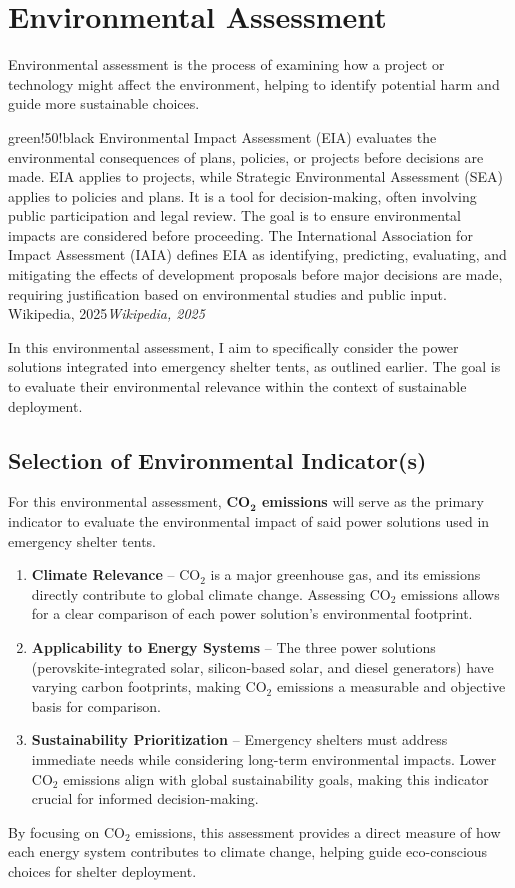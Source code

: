 \documentclass{article}
\newcommand{\formalsource}{}
\newenvironment{formal}[3][]{	\renewcommand{\formalsource}{#1}
	\def\lefty{\color{#2}\textquotedblleft}
	\def\righty{\color{#2}\textquotedblright}
	\def\FrameCommand{%
		\hspace{1pt}%
		{\color{#2}\vrule width 2pt}%
		{\color{#3}\vrule width 4pt}%
		\colorbox{#3}%
	}%
	\MakeFramed{\advance\hsize-\width\FrameRestore}%
    \begin{adjustwidth}{5pt}{7pt}%
	\vspace{4pt}%
	\ifx#2\empty\else\smash{\raisebox{-0.5em}{\huge\lefty}}\hspace{0em}\fi%
	}{%
	\hspace{0em}\smash{\raisebox{-0.5em}{\huge\righty}}\\%
	\vspace{0pt}%
	\ifx\formalsource\empty\else\hfill{\footnotesize\textit{\formalsource}}\fi%
\end{adjustwidth}%
\endMakeFramed%
\noindent%
}
\begin{document}
\newpage
\section{Environmental Assessment}
Environmental assessment is the process of examining how a project or technology might affect the environment, helping to identify potential harm and guide more sustainable choices.
\begin{formal}[Wikipedia, 2025]{green!50!black}{white} Environmental Impact Assessment (EIA) evaluates the environmental consequences of plans, policies, or projects before decisions are made. EIA applies to projects, while Strategic Environmental Assessment (SEA) applies to policies and plans. It is a tool for decision-making, often involving public participation and legal review. The goal is to ensure environmental impacts are considered before proceeding. The International Association for Impact Assessment (IAIA) defines EIA as identifying, predicting, evaluating, and mitigating the effects of development proposals before major decisions are made, requiring justification based on environmental studies and public input. 
\end{formal}
In this environmental assessment, I aim to specifically consider the power solutions integrated into emergency shelter tents, as outlined earlier. The goal is to evaluate their environmental relevance within the context of sustainable deployment.

\subsection{Selection of Environmental Indicator(s)}  
For this environmental assessment, \textbf{CO$\bm{_2}$ emissions} will serve as the primary indicator to evaluate the environmental impact of said power solutions used in emergency shelter tents.
\begin{enumerate}[itemsep=-1mm]
	\item \textbf{Climate Relevance} – CO$_2$ is a major greenhouse gas, and its emissions directly contribute to global climate change. Assessing CO$_2$ emissions allows for a clear comparison of each power solution's environmental footprint.
	\item \textbf{Applicability to Energy Systems} – The three power solutions (perovskite-integrated solar, silicon-based solar, and diesel generators) have varying carbon footprints, making CO$_2$ emissions a measurable and objective basis for comparison.
	\item \textbf{Sustainability Prioritization} – Emergency shelters must address immediate needs while considering long-term environmental impacts. Lower CO$_2$ emissions align with global sustainability goals, making this indicator crucial for informed decision-making.
\end{enumerate}
By focusing on CO$_2$ emissions, this assessment provides a direct measure of how each energy system contributes to climate change, helping guide eco-conscious choices for shelter deployment.
\end{document}
